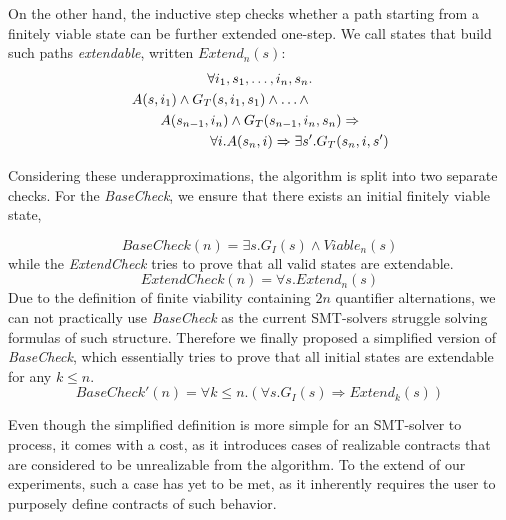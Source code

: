 On the other hand, the inductive step checks whether a path starting from a
finitely viable state can be further extended one-step. We call states that
build such paths \textit{extendable}, written $Extend_{n}(s)$:
	\begin{multline}
	\label{ml:extendable}
		\forall i_1,s_1,\ldots,i_n,s_n. \\
		\hspace{-2cm} A(s,i_1) \wedge G_T(s,i_1,s_1) \wedge \ldots \wedge \\
		A(s_{n-1}, i_n) \wedge G_T(s_{n-1},i_n,s_n) \Rightarrow \\
		\hspace{+2cm} \forall i. A(s_n,i) \Rightarrow \exists s'. G_T(s_n,i,s')
	\end{multline}
	
Considering these underapproximations, the algorithm is split into two separate
checks. For the \textit{BaseCheck}, we ensure that there exists an initial
finitely viable state,


\begin{equation}
\label{bcheck}
BaseCheck(n) = \exists s. G_I(s) \wedge Viable_n(s)
\end{equation}
while the \textit{ExtendCheck} tries to prove that all
valid states are extendable.
\begin{equation}
\label{eq:echeck}
ExtendCheck(n) = \forall s. Extend_n(s)
\end{equation}
Due to the definition of finite viability containing $2n$
quantifier alternations, we can not practically use \textit{BaseCheck} as the
current SMT-solvers struggle solving formulas of such structure. Therefore we
finally proposed a simplified version of \textit{BaseCheck}, which essentially
tries to prove that all initial states are extendable for any $k \leq n$.
\begin{equation}
\label{eq:sbcheck}
BaseCheck'(n) = \forall k \leq n. (\forall s. G_I(s)
	  	\Rightarrow Extend_k(s))
\end{equation}

Even though the simplified definition is more simple for an SMT-solver to
process, it comes with a cost, as it introduces cases of realizable contracts
that are considered to be unrealizable from the algorithm. To the extend of our
experiments, such a case has yet to be met, as it inherently requires the user
to purposely define contracts of such behavior.

